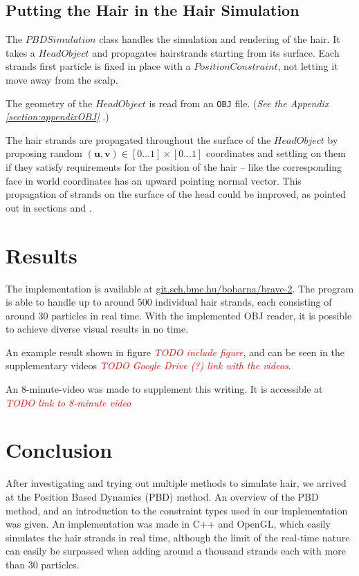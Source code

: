 \documentclass[sigplan,screen,nonacm]{acmart}
\newcommand\TODO[1]{\textcolor{red}{\emph{TODO #1}}}
\renewcommand{\b}{\boldsymbol}
\begin{document}
\subsection{Putting the Hair in the Hair Simulation}
The $PBDSimulation$ class handles the simulation and rendering of the hair. It
takes a $HeadObject$ and propagates hairstrands starting from its surface. Each
strands first particle is fixed in place with a $PositionConstraint$, not
letting it move away from the scalp.

The geometry of the $HeadObject$ is read from an \texttt{OBJ} file. (\emph{See
the Appendix \ref{section:appendixOBJ} }.)

The hair strands are propagated throughout the surface of the $HeadObject$ by
proposing random $(\b{u}, \b{v}) \in [0 \ldots 1] \times [0 \ldots 1]$
coordinates and settling on them if they satisfy requirements for the position
of the hair -- like the corresponding face in world coordinates has an upward
pointing normal vector. This propagation of strands on the surface of the head
could be improved, as pointed out in sections
 and .
 

\section{Results}
The implementation is available at \url{git.sch.bme.hu/bobarna/brave-2}. The
program is able to handle up to around 500 individual hair strands, each
consisting of around 30 particles in real time. With the implemented OBJ reader,
it is possible to achieve diverse visual results in no time.

An example result shown in figure \TODO{include figure}, and can be seen in the
supplementary videos \TODO{Google Drive (?) link with the videos}.

An 8-minute-video was made to supplement this writing. It is accessible at
\TODO{link to 8-minute video}

\section{Conclusion}
\label{sec:conclusion}
After investigating and trying out multiple methods to simulate hair, we arrived
at the Position Based Dynamics (PBD) method. An overview of the PBD method, and
an introduction to the constraint types used in our implementation was given.
An implementation was made in C++ and OpenGL, which easily simulates the hair
strands in real time, although the limit of the real-time nature can easily be
surpassed when adding around a thousand strands each with more than 30
particles.
\end{document}
